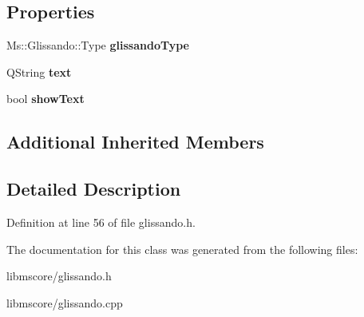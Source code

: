 \subsection*{Properties}
\begin{DoxyCompactItemize}
\item 
\mbox{\label{class_ms_1_1_glissando_a2ad6bb1e654f88325947a7bdb811295a}} 
Ms\+::\+Glissando\+::\+Type {\bfseries glissando\+Type}
\item 
\mbox{\label{class_ms_1_1_glissando_ac8fa942d2732759b5ea59c9f3a27c1b5}} 
Q\+String {\bfseries text}
\item 
\mbox{\label{class_ms_1_1_glissando_a389b6c501ac1dc953e47ff98b1e047c8}} 
bool {\bfseries show\+Text}
\end{DoxyCompactItemize}
\subsection*{Additional Inherited Members}


\subsection{Detailed Description}


Definition at line 56 of file glissando.\+h.



The documentation for this class was generated from the following files\+:\begin{DoxyCompactItemize}
\item 
libmscore/glissando.\+h\item 
libmscore/glissando.\+cpp\end{DoxyCompactItemize}
